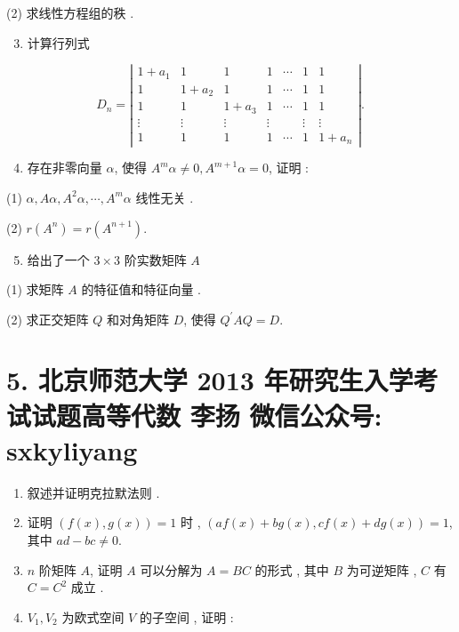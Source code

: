 \documentclass[10pt]{article}
\begin{document}
{(2)  求线性方程组的秩 .

\begin{enumerate}
  \setcounter{enumi}{2}
  \item  计算行列式 
\end{enumerate}
$$
D_{n}=\left|\begin{array}{ccccccc}
1+a_{1} & 1 & 1 & 1 & \cdots & 1 & 1 \\
1 & 1+a_{2} & 1 & 1 & \cdots & 1 & 1 \\
1 & 1 & 1+a_{3} & 1 & \cdots & 1 & 1 \\
\vdots & \vdots & \vdots & \vdots & & \vdots & \vdots \\
1 & 1 & 1 & 1 & \cdots & 1 & 1+a_{n}
\end{array}\right| .
$$

\begin{enumerate}
  \setcounter{enumi}{3}
  \item  存在非零向量  $\alpha$,  使得  $A^{m} \alpha \neq 0, A^{m+1} \alpha=0$,  证明 :
\end{enumerate}
(1) $\alpha, A \alpha, A^{2} \alpha, \cdots, A^{m} \alpha$  线性无关 .

(2) $r\left(A^{n}\right)=r\left(A^{n+1}\right)$.

\begin{enumerate}
  \setcounter{enumi}{4}
  \item  给出了一个  $3 \times 3$  阶实数矩阵  $A$
\end{enumerate}
(1)  求矩阵  $A$  的特征值和特征向量 .

(2)  求正交矩阵  $Q$  和对角矩阵  $D$,  使得  $Q^{\prime} A Q=D$.

\section{5. 北京师范大学 2013 年研究生入学考试试题高等代数 
 李扬 
 微信公众号: sxkyliyang}
\begin{enumerate}
  \item  叙述并证明克拉默法则 .

  \item  证明  $(f(x), g(x))=1$  时 , $(a f(x)+b g(x), c f(x)+d g(x))=1$,  其中  $a d-b c \neq 0$.

  \item $n$  阶矩阵  $A$,  证明  $A$  可以分解为  $A=B C$  的形式 ,  其中  $B$  为可逆矩阵 , $C$  有  $C=C^{2}$  成立 .

  \item $V_{1}, V_{2}$  为欧式空间  $V$  的子空间 ,  证明 :


\end{enumerate}}
\end{document}
